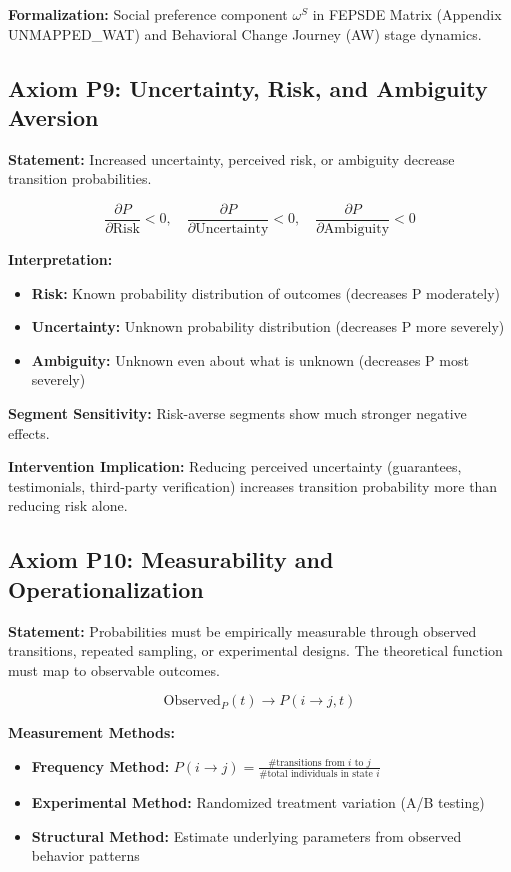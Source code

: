 \documentclass[11pt, a4paper]{article}
\begin{document}
\textbf{Formalization:} Social preference component $\omega^S$ in FEPSDE Matrix (Appendix UNMAPPED_WAT) and Behavioral Change Journey (AW) stage dynamics.

\subsection{Axiom P9: Uncertainty, Risk, and Ambiguity Aversion}

\textbf{Statement:} Increased uncertainty, perceived risk, or ambiguity decrease transition probabilities.

\begin{equation}
\frac{\partial P}{\partial \text{Risk}} < 0, \quad \frac{\partial P}{\partial \text{Uncertainty}} < 0, \quad \frac{\partial P}{\partial \text{Ambiguity}} < 0
\end{equation}

\textbf{Interpretation:}
\begin{itemize}[nosep]
    \item \textbf{Risk:} Known probability distribution of outcomes (decreases P moderately)
    \item \textbf{Uncertainty:} Unknown probability distribution (decreases P more severely)
    \item \textbf{Ambiguity:} Unknown even about what is unknown (decreases P most severely)
\end{itemize}

\textbf{Segment Sensitivity:} Risk-averse segments show much stronger negative effects.

\textbf{Intervention Implication:} Reducing perceived uncertainty (guarantees, testimonials, third-party verification) increases transition probability more than reducing risk alone.

\subsection{Axiom P10: Measurability and Operationalization}

\textbf{Statement:} Probabilities must be empirically measurable through observed transitions, repeated sampling, or experimental designs. The theoretical function must map to observable outcomes.

\begin{equation}
\text{Observed}_P(t) \to P(i \to j, t)
\end{equation}

\textbf{Measurement Methods:}
\begin{itemize}[nosep]
    \item \textbf{Frequency Method:} $P(i \to j) = \frac{\text{\# transitions from } i \text{ to } j}{\text{\# total individuals in state } i}$
    \item \textbf{Experimental Method:} Randomized treatment variation (A/B testing)
    \item \textbf{Structural Method:} Estimate underlying parameters from observed behavior patterns
\end{itemize}
\end{document}
